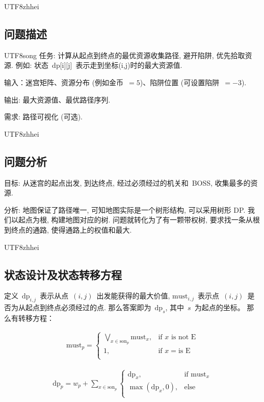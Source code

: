 \documentclass[10.5pt,compsoc]{CjC}
\theoremstyle{mystyle}
\begin{document}
\begin{CJK*}{UTF8}{zhhei}\subsection{问题描述}\end{CJK*}

\begin{CJK*}{UTF8}{song}
任务: 计算从起点到终点的最优资源收集路径, 避开陷阱, 优先拾取资源.
例如: 状态~dp[i][j]~表示走到坐标(i,j)时的最大资源值.

输入：迷宫矩阵、资源分布 (例如金币~$=5$)、陷阱位置 (可设置陷阱~$=-3$).

输出: 最大资源值、最优路径序列.

需求: 路径可视化 (可选).

\begin{CJK*}{UTF8}{zhhei}\subsection{问题分析}\end{CJK*}

目标: 从迷宫的起点出发, 到达终点, 经过必须经过的机关和~BOSS, 收集最多的资源.

分析: 地图保证了路径唯一, 可知地图实际是一个树形结构, 可以采用树形 DP.
我们以起点为根, 构建地图对应的树.
问题就转化为了有一颗带权树, 要求找一条从根到终点的通路, 使得通路上的权值和最大.


\begin{CJK*}{UTF8}{zhhei}\subsection{状态设计及状态转移方程}\end{CJK*}

定义~$\textrm{dp}_{i, j}$~表示从点~$(i,j)$~出发能获得的最大价值,
$\textrm{must}_{i,j}$~表示点~$(i,j)$~是否为从起点到终点必须经过的点.
那么答案即为~$\textrm{dp}_s$, 其中~$s$~为起点的坐标。
那么有转移方程：

\begin{align*}
\textrm{must}_p = 
\begin{cases}
\displaystyle \bigvee_{x\in{\text{son}}_p} \textrm{must}_x, & \text{if } x \text{ is not E} \\
1, & \text{if } x = \text{is E} \\
\end{cases}
\end{align*}

\begin{align*}
\textrm{dp}_p = w_p + \displaystyle \sum_{x\in{\text{son}}_p}
\begin{cases}
\textrm{dp}_x, & \text{if } \textrm{must}_x \\
\max(\textrm{dp}_x, 0), & \text{else} \\
\end{cases}
\end{align*}



\end{CJK*}
\end{document}
